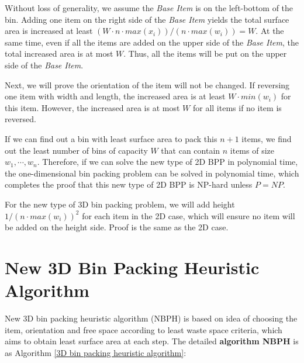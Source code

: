 \documentclass[sigconf]{acmart}
\begin{document}
Without loss of generality, we assume the \emph{Base Item} is on the left-bottom of the bin. Adding one item on the right side of the \emph{Base Item} yields the total surface area is increased at least $ (W \cdot n \cdot max(x_i) )/( n \cdot max(w_i)) = W$. At the same time, even if all the items are added on the upper side of the \emph{Base Item}, the total increased area is at most $W$. Thus, all the items will be put on the upper side of the \emph{Base Item}. 

Next, we will prove the orientation of the item will not be changed. If reversing one item with width and length, the increased area is at least $W \cdot min(w_i)$ for this item. However, the increased area is at most $W$ for all items if no item is reversed. 

If we can find out a bin with least surface area to pack this $n+1$ items, we find out the least number of bins of capacity $W$ that can contain $n$ items of size $w_1, \cdots, w_n$. Therefore, if we can solve the new type of 2D BPP in polynomial time, the one-dimensional bin packing problem can be solved in polynomial time, which completes the proof that this new type of 2D BPP is NP-hard unless $P = NP$.

For the new type of 3D bin packing problem, we will add height $1/(n \cdot max({w_i}))^2$ for each item in the 2D case, which will ensure no item will be added on the height side. Proof is the same as the 2D case.

\section{New 3D Bin Packing Heuristic Algorithm}
\label{NBPH}
New 3D bin packing heuristic algorithm (NBPH) is based on idea of choosing the item, orientation and free space according to least waste space criteria, which aims to obtain least surface area at each step. The detailed \textbf{algorithm NBPH} is as Algorithm \ref{3D bin packing heuristic algorithm}:
\end{document}
